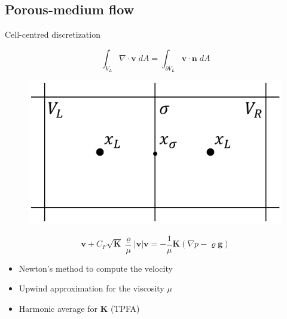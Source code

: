 \documentclass{beamer}
\begin{document}
\subsection*{Porous-medium flow}
\begin{frame}{Cell-centred discretization}
\begin{minipage}[t]{0.49\textwidth}
	\vspace{0.5cm}
\begin{equation*}
\int_{V_L} \nabla \cdot \mathbf{v} \; dA = \int_{\partial V_L} \mathbf{v} 
\cdot \mathbf{n} \; dA
\end{equation*}
\end{minipage}
\begin{minipage}[t]{0.49\textwidth}
\begin{figure}
	\centering
	\includegraphics[height=0.3\textheight]{cctpfa.pdf}
\end{figure}
\end{minipage}
\begin{equation*}
	\mathbf{v} + C_F \sqrt{\mathbf{K}} \frac{\varrho}{\mu} |\mathbf{v}| 
	\mathbf{v} = - \frac{1}{\mu}\mathbf{K} (\nabla p - \varrho \mathbf{g})
\end{equation*}
\begin{itemize}
	\item Newton's method to compute the velocity
	\item Upwind approximation for the viscosity $\mu$
	\item Harmonic average for $\mathbf{K}$ (TPFA)
\end{itemize}
\end{frame}
\end{document}
